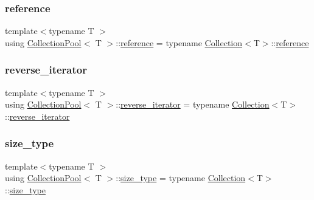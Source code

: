\mbox{\label{class_collection_pool_a12dd127db0342d4b694d857f6c77ad90}} 
\subsubsection{\texorpdfstring{reference}{reference}}
{\footnotesize\ttfamily template$<$typename T $>$ \\
using \hyperlink{class_collection_pool}{Collection\+Pool}$<$ T $>$\+::\hyperlink{class_collection_abbc291771b11c48cd2f297a0d9fe0449}{reference} =  typename \hyperlink{class_collection}{Collection}$<$T$>$\+::\hyperlink{class_collection_abbc291771b11c48cd2f297a0d9fe0449}{reference}}

\mbox{\label{class_collection_pool_a02f041d9c0562d656eaa05a9859780af}} 
\subsubsection{\texorpdfstring{reverse\+\_\+iterator}{reverse\_iterator}}
{\footnotesize\ttfamily template$<$typename T $>$ \\
using \hyperlink{class_collection_pool}{Collection\+Pool}$<$ T $>$\+::\hyperlink{class_collection_ac3805407b2dc537e71db7af070b8d8a6}{reverse\+\_\+iterator} =  typename \hyperlink{class_collection}{Collection}$<$T$>$\+::\hyperlink{class_collection_ac3805407b2dc537e71db7af070b8d8a6}{reverse\+\_\+iterator}}

\mbox{\label{class_collection_pool_a3fe4d4cbb79a3cb138cdb3f07c401b00}} 
\subsubsection{\texorpdfstring{size\+\_\+type}{size\_type}}
{\footnotesize\ttfamily template$<$typename T $>$ \\
using \hyperlink{class_collection_pool}{Collection\+Pool}$<$ T $>$\+::\hyperlink{class_collection_a3f8b024f587aa20be530866da30948c4}{size\+\_\+type} =  typename \hyperlink{class_collection}{Collection}$<$T$>$\+::\hyperlink{class_collection_a3f8b024f587aa20be530866da30948c4}{size\+\_\+type}}

